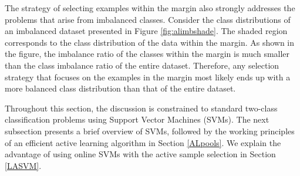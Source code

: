 The strategy of selecting examples within the margin also strongly addresses the problems that arise from imbalanced classes.  Consider the class distributions of an imbalanced dataset presented in Figure \ref{fig:alimbshade}. The shaded region corresponds to the class distribution of the data within the margin. As shown in the figure, the imbalance ratio of the classes within the margin is much smaller than the class imbalance ratio of the entire dataset. Therefore, any selection strategy that focuses on the examples in the margin most likely ends up with a more balanced class distribution than that of the entire dataset. %

Throughout this section, the discussion is constrained to standard two-class classification problems using Support Vector Machines (SVMs). The next subsection presents a brief overview of SVMs, followed by the working principles of an efficient active learning algorithm in Section \ref{ALpools}. We explain the advantage of using online SVMs with the active sample selection in Section \ref{LASVM}.%

